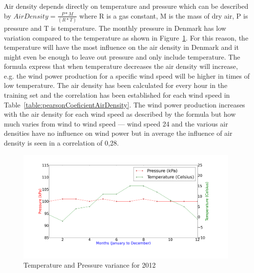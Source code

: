 Air density depends directly on temperature and pressure which can be described by $Air Density=\frac{P*M}{(R*T)}$ where R is a gas constant, M is the mass of dry air, P is pressure and T is temperature. The monthly pressure in Denmark has low variation compared to the temperature as shown in Figure~\ref{fig:pressureTemperatureVariance}. For this reason, the temperature will have the most influence on the air density in Denmark and it might even be enough to leave out pressure and only include temperature. The formula express that when temperature decreases the air density will increase, e.g. the wind power production for a specific wind speed will be higher in times of low temperature. The air density has been calculated for every hour in the training set and the correlation has been established for each wind speed in Table~\ref{table:pearsonCoeficientAirDensity}. The wind power production increases with the air density for each wind speed as described by the formula but how much varies from wind to wind speed --- wind speed 24 and the various air densities have no influence on wind power but in average the influence of air density is seen in a correlation of 0,28.

\begin{figure}[h!]
\centering
\includegraphics[width=0.99\textwidth]{billeder/pressureTemperatureVariance.png}
\caption{Temperature and Pressure variance for 2012}
\label{fig:pressureTemperatureVariance}
\end{figure}

